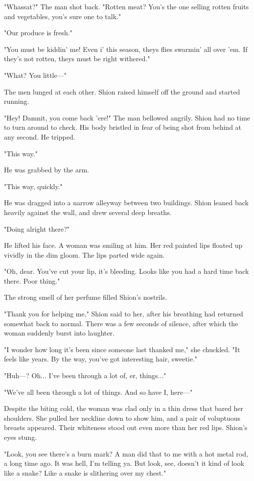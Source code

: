 "Whassat?" The man shot back. "Rotten meat? You's the one selling rotten
fruits and vegetables, you's sure one to talk."

"Our produce is fresh."

"You must be kiddin' me! Even i' this season, theys flies swarmin' all
over 'em. If they's not rotten, theys must be right withered."

"What? You little---"

The men lunged at each other. Shion raised himself off the ground and
started running.

"Hey! Damnit, you come back 'ere!" The man bellowed angrily. Shion had
no time to turn around to check. His body bristled in fear of being shot
from behind at any second. He tripped.

"This way."

He was grabbed by the arm.

"This way, quickly."

He was dragged into a narrow alleyway between two buildings. Shion
leaned back heavily against the wall, and drew several deep breaths.

"Doing alright there?"

He lifted his face. A woman was smiling at him. Her red painted lips
floated up vividly in the dim gloom. The lips parted wide again.

"Oh, dear. You've cut your lip, it's bleeding. Looks like you had a hard
time back there. Poor thing."

The strong smell of her perfume filled Shion's nostrils.

"Thank you for helping me," Shion said to her, after his breathing had
returned somewhat back to normal. There was a few seconds of silence,
after which the woman suddenly burst into laughter.

"I wonder how long it's been since someone last thanked me," she
chuckled. "It feels like years. By the way, you've got interesting hair,
sweetie."

"Huh---? Oh... I've been through a lot of, er, things..."

"We've all been through a lot of things. And so have I, here---"

Despite the biting cold, the woman was clad only in a thin dress that
bared her shoulders. She pulled her neckline down to show him, and a
pair of voluptuous breasts appeared. Their whiteness stood out even more
than her red lips. Shion's eyes stung.

"Look, you see there's a burn mark? A man did that to me with a hot
metal rod, a long time ago. It was hell, I'm telling ya. But look, see,
doesn't it kind of look like a snake? Like a snake is slithering over my
chest."

